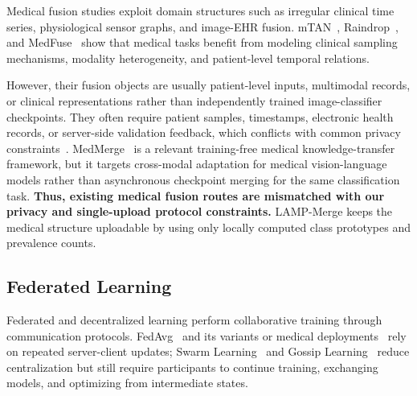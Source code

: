 \documentclass[letterpaper]{article} %
\begin{document}
Medical fusion studies exploit domain structures such as irregular clinical time series, physiological sensor graphs, and image-EHR fusion. mTAN~\cite{shukla2021multitimeattentionnetworksirregularly}, Raindrop~\cite{zhang2022graphguidednetworkirregularlysampled}, and MedFuse~\cite{hayat2023medfusemultimodalfusionclinical} show that medical tasks benefit from modeling clinical sampling mechanisms, modality heterogeneity, and patient-level temporal relations.

However, their fusion objects are usually patient-level inputs, multimodal records, or clinical representations rather than independently trained image-classifier checkpoints. They often require patient samples, timestamps, electronic health records, or server-side validation feedback, which conflicts with common privacy constraints~\cite{kaissis2020secure,sheller2020federated,bonawitz2019towards}. MedMerge~\cite{11382027} is a relevant training-free medical knowledge-transfer framework, but it targets cross-modal adaptation for medical vision-language models rather than asynchronous checkpoint merging for the same classification task. \textbf{Thus, existing medical fusion routes are mismatched with our privacy and single-upload protocol constraints.} LAMP-Merge keeps the medical structure uploadable by using only locally computed class prototypes and prevalence counts.

\subsection{Federated Learning}

Federated and decentralized learning perform collaborative training through communication protocols. FedAvg~\cite{pmlr-v54-mcmahan17a} and its variants or medical deployments~\cite{li2020fedprox,karimireddy2020scaffold,li2021fedbn,kaissis_secure_2020,sheller2020federated,rieke2020future,kairouz2021advances} rely on repeated server-client updates; Swarm Learning~\cite{warnat-herresthal_swarm_2021} and Gossip Learning~\cite{hegedhus_gossip_2019} reduce centralization but still require participants to continue training, exchanging models, and optimizing from intermediate states.
\end{document}
